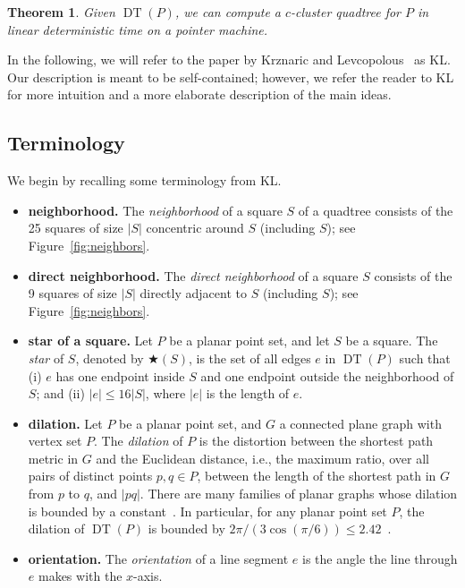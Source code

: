 \documentclass[11pt]{paper}
\DeclareMathOperator {\DT}{DT}
\newtheorem {theorem} {Theorem}[section]
\begin{document}
\begin{theorem}\label{thm:dt->c-cluster-qt}
Given $\DT(P)$, we can compute a $c$-cluster quadtree
for $P$ in linear deterministic time on a pointer machine.
\end{theorem}

In the following, we will refer to the paper by Krznaric and
Levcopolous~\cite{KrznaricLe98} as KL.
Our description is meant to be self-contained; however, we refer the reader to KL for more intuition and a more elaborate description of the main ideas.

\subsection{Terminology}
We begin by recalling some terminology from KL.

\begin{itemize}
\item \textbf{neighborhood.}
The \emph{neighborhood} of a square $S$ of a quadtree
consists of the 25 squares of size $|S|$ concentric around
$S$ (including $S$); see Figure~\ref{fig:neighbors}.
\item \textbf{direct neighborhood.}
The \emph{direct neighborhood} of a square
$S$ consists of the 9 squares of size $|S|$ directly adjacent to $S$
(including $S$); see Figure~\ref{fig:neighbors}.
\item \textbf{star of a square.}
Let $P$ be a planar point set, and let $S$ be a square. The \emph{star}
of $S$, denoted by $\bigstar(S)$, is the set of all edges $e$ in $\DT(P)$
such that (i) $e$ has one endpoint inside $S$ and one endpoint outside the
neighborhood of $S$; and (ii) $|e| \leq 16|S|$, where $|e|$ is
the length of $e$.
\item \textbf{dilation.}
Let $P$ be a planar point set, and $G$ a connected plane graph with
vertex set $P$. The \emph{dilation} of $P$ is the distortion between
the shortest path metric in $G$ and the Euclidean distance, i.e.,
the maximum ratio, over all pairs of distinct points $p,q \in P$, between
the length of the shortest path in $G$ from $p$ to $q$, and $|pq|$. There
are many families of planar graphs whose dilation is bounded by a
constant~\cite{DasJo89}.
In particular, for any planar point set $P$, the
dilation of $\DT(P)$ is bounded
by $2\pi/(3\cos(\pi/6)) \leq 2.42$~\cite{KeilGu92}.
\item \textbf{orientation.}
The \emph{orientation} of a line segment $e$ is the angle
the line through $e$ makes with the $x$-axis.
\end{itemize}
\end{document}
